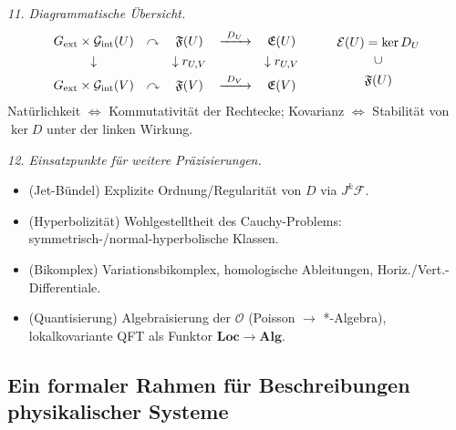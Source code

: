 \documentclass[10pt, letterpaper]{article}
\begin{document}
\bigskip
\emph{11. Diagrammatische Übersicht.}
\[
\begin{array}{ccccc}
G_{\mathrm{ext}}\times \mathcal G_{\mathrm{int}}(U) 
& \curvearrowright & \mathfrak F(U) & \xrightarrow{\ D_U\ } & \mathfrak E(U)\\[0.4em]
\downarrow & & \downarrow r_{U,V} & & \downarrow r_{U,V}\\[0.4em]
G_{\mathrm{ext}}\times \mathcal G_{\mathrm{int}}(V) 
& \curvearrowright & \mathfrak F(V) & \xrightarrow{\ D_V\ } & \mathfrak E(V)
\end{array}
\qquad
\begin{array}{c}
\mathcal E(U)=\ker D_U \\[0.3em]
\rotatebox{90}{$\subset$}\\[0.3em]
\mathfrak F(U)
\end{array}
\]
Natürlichkeit $\Leftrightarrow$ Kommutativität der Rechtecke; 
Kovarianz $\Leftrightarrow$ Stabilität von $\ker D$ unter der linken Wirkung.

\bigskip
\emph{12. Einsatzpunkte für weitere Präzisierungen.}
\begin{itemize}
\item (Jet-Bündel) Explizite Ordnung/Regularität von $D$ via $J^k\mathcal F$.
\item (Hyperbolizität) Wohlgestelltheit des Cauchy-Problems: symmetrisch-/normal-hyperbolische Klassen.
\item (Bikomplex) Variationsbikomplex, homologische Ableitungen, Horiz./Vert.-Differentiale.
\item (Quantisierung) Algebraisierung der $\mathcal O$ (Poisson $\to$ *-Algebra), lokalkovariante QFT als Funktor $\mathbf{Loc}\to\mathbf{Alg}$.
\end{itemize}


\subsection{Ein formaler Rahmen für Beschreibungen physikalischer Systeme}
\end{document}
